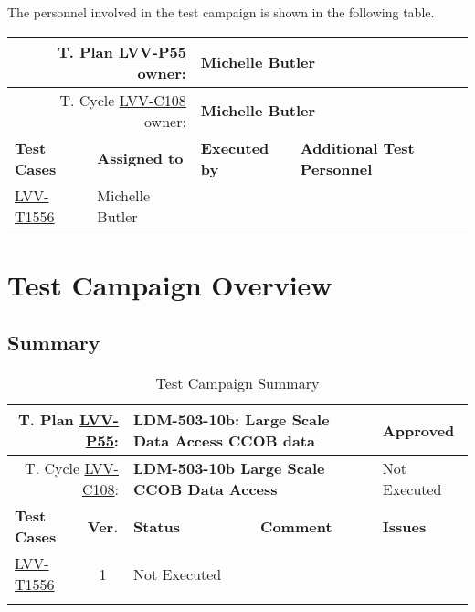 \documentclass[DM,lsstdraft,STR,toc]{lsstdoc}
\begin{document}
The personnel involved in the test campaign is shown in the following table.

{\small
\begin{longtable}{p{3cm}p{3cm}p{3cm}p{6cm}}
\hline
\multicolumn{2}{r}{T. Plan \href{https://jira.lsstcorp.org/secure/Tests.jspa\#/testPlan/LVV-P55}{LVV-P55} owner:} &
\multicolumn{2}{l}{\textbf{ Michelle Butler } }\\\hline
\multicolumn{2}{r}{T. Cycle \href{https://jira.lsstcorp.org/secure/Tests.jspa\#/testCycle/LVV-C108}{LVV-C108} owner:} &
\multicolumn{2}{l}{\textbf{
Michelle Butler }
} \\\hline
\textbf{Test Cases} & \textbf{Assigned to} & \textbf{Executed by} & \textbf{Additional Test Personnel} \\ \hline
\href{https://jira.lsstcorp.org/secure/Tests.jspa#/testCase/LVV-T1556}{LVV-T1556}
& {\small Michelle Butler } & {\small  } &
\begin{minipage}[]{6cm}
\smallskip
{\small  }
\medskip
\end{minipage}
\\ \hline
\end{longtable}
}

\newpage

\section{Test Campaign Overview}
\label{sect:overview}

\subsection{Summary}
\label{sect:summarytable}

{\small
\begin{longtable}{p{2cm}cp{2.3cm}p{8.6cm}p{2.3cm}}
\toprule
\multicolumn{2}{r}{ T. Plan \href{https://jira.lsstcorp.org/secure/Tests.jspa\#/testPlan/LVV-P55}{LVV-P55}:} &
\multicolumn{2}{p{10.9cm}}{\textbf{ LDM-503-10b: Large Scale Data Access CCOB data }} & Approved \\\hline
\multicolumn{2}{r}{ T. Cycle \href{https://jira.lsstcorp.org/secure/Tests.jspa\#/testCycle/LVV-C108}{LVV-C108}:} &
\multicolumn{2}{p{10.9cm}}{\textbf{ LDM-503-10b Large Scale CCOB Data Access }} & Not Executed \\\hline
\textbf{Test Cases} &  \textbf{Ver.} & \textbf{Status} & \textbf{Comment} & \textbf{Issues} \\\toprule
\href{https://jira.lsstcorp.org/secure/Tests.jspa#/testCase/LVV-T1556}{LVV-T1556}
&  1
& Not Executed &
\begin{minipage}[]{9cm}
\smallskip

\medskip
\end{minipage}
&
\\\hline
\caption{Test Campaign Summary}
\label{table:summary}
\end{longtable}
}
\end{document}
